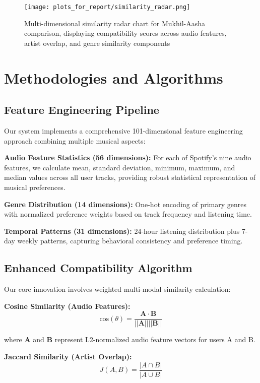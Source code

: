 \documentclass[conference]{IEEEtran}
\begin{document}
\begin{figure}[htbp]
\centerline{\texttt{[image: plots\_for\_report/similarity\_radar.png]}}
\caption{Multi-dimensional similarity radar chart for Mukhil-Aasha comparison, displaying compatibility scores across audio features, artist overlap, and genre similarity components}
\label{fig:similarity_radar}
\end{figure}

\section{Methodologies and Algorithms}

\subsection{Feature Engineering Pipeline}

Our system implements a comprehensive 101-dimensional feature engineering approach combining multiple musical aspects:

\textbf{Audio Feature Statistics (56 dimensions):} For each of Spotify's nine audio features, we calculate mean, standard deviation, minimum, maximum, and median values across all user tracks, providing robust statistical representation of musical preferences.

\textbf{Genre Distribution (14 dimensions):} One-hot encoding of primary genres with normalized preference weights based on track frequency and listening time.

\textbf{Temporal Patterns (31 dimensions):} 24-hour listening distribution plus 7-day weekly patterns, capturing behavioral consistency and preference timing.

\subsection{Enhanced Compatibility Algorithm}

Our core innovation involves weighted multi-modal similarity calculation:

\textbf{Cosine Similarity (Audio Features):}
\begin{equation}
\text{cos}(\theta) = \frac{\mathbf{A} \cdot \mathbf{B}}{||\mathbf{A}|| ||\mathbf{B}||}
\end{equation}

where $\mathbf{A}$ and $\mathbf{B}$ represent L2-normalized audio feature vectors for users A and B.

\textbf{Jaccard Similarity (Artist Overlap):}
\begin{equation}
J(A,B) = \frac{|A \cap B|}{|A \cup B|}
\end{equation}
\end{document}
